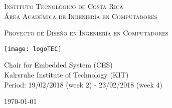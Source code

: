 
\thispagestyle{empty} 

\begin{center}

\textsc{\LARGE Instituto Tecnol\'ogico de Costa Rica} \\
\textsc{\Large \'Area Acad\'emica de Ingenier\'ia en Computadores}

\textsc{\Large Proyecto de Dise\~no en Ingenier\'ia en Computadores}


\par\vspace{20mm}

\texttt{[image: logoTEC]}

\par\vspace*{\fill}

{\LARGE\bf{\textsf{ \Huge \scriptTitle}}}

\par\vspace*{\fill}

Chair for Embedded System (CES) \\
Kalrsruhe Institute of Technology (KIT) \\
Period: 19/02/2018 (week 2) - 23/02/2018 (week 4) 

\par\vspace{20mm}

\textsc{\Large \scriptAuthor}

\vspace*{\fill}

{\today}

\end{center}
\newpage 
\cleardoublepage  
